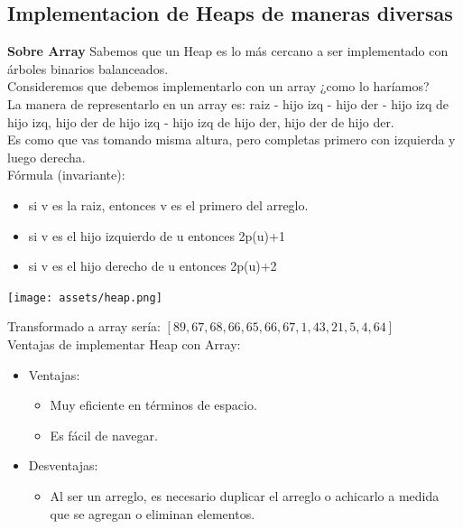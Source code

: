 \documentclass[10pt,a4paper]{article}
\begin{document}
\subsection*{Implementacion de Heaps de maneras diversas}
\label{subsec:implementaciones_heap}
\textbf{Sobre Array}
Sabemos que un Heap es lo más cercano a ser implementado con árboles binarios balanceados. \\ 
Consideremos que debemos implementarlo con un array ¿como lo haríamos? \\
La manera de representarlo en un array es: raiz - hijo izq - hijo der - hijo izq de hijo izq, hijo der de hijo izq - hijo izq de hijo der, hijo der de hijo der. \\
Es como que vas tomando misma altura, pero completas primero con izquierda y luego derecha. \\
Fórmula (invariante): 
\begin{itemize}
    \item si v es la raiz, entonces v es el primero del arreglo.
    \item si v es el hijo izquierdo de u entonces 2p(u)+1
    \item si v es el hijo derecho de u entonces 2p(u)+2
\end{itemize}
\begin{center}
    \begin{minipage}[b]{0.6\textwidth}
        \texttt{[image: assets/heap.png]}
        \centering
        \label{fig:heap}
    \end{minipage}
\end{center}
Transformado a array sería: $[89, 67, 68, 66, 65, 66, 67, 1, 43, 21, 5, 4, 64]$ \\
Ventajas de implementar Heap con Array: 
\begin{itemize}
    \item Ventajas:
    \begin{itemize}
        \item Muy eficiente en términos de espacio.
        \item Es fácil de navegar.
    \end{itemize}
    \item Desventajas:
    \begin{itemize}
        \item Al ser un arreglo, es necesario duplicar el arreglo o achicarlo a medida que se agregan o eliminan elementos.
    \end{itemize}
\end{itemize}
\end{document}
